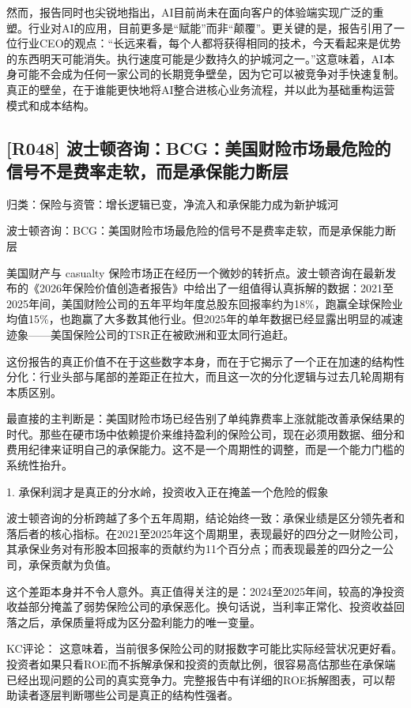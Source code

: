 \documentclass[11pt]{ctexart}
\begin{document}
然而，报告同时也尖锐地指出，AI目前尚未在面向客户的体验端实现广泛的重塑。行业对AI的应用，目前更多是“赋能”而非“颠覆”。更关键的是，报告引用了一位行业CEO的观点：“长远来看，每个人都将获得相同的技术，今天看起来是优势的东西明天可能消失。执行速度可能是少数持久的护城河之一。”这意味着，AI本身可能不会成为任何一家公司的长期竞争壁垒，因为它可以被竞争对手快速复制。真正的壁垒，在于谁能更快地将AI整合进核心业务流程，并以此为基础重构运营模式和成本结构。

\subsection{[R048] 波士顿咨询：BCG：美国财险市场最危险的信号不是费率走软，而是承保能力断层}
{\small\color{refgray}归类：保险与资管：增长逻辑已变，净流入和承保能力成为新护城河}

波士顿咨询：BCG：美国财险市场最危险的信号不是费率走软，而是承保能力断层

美国财产与 casualty 保险市场正在经历一个微妙的转折点。波士顿咨询在最新发布的《2026年保险价值创造者报告》中给出了一组值得认真拆解的数据：2021至2025年间，美国财险公司的五年平均年度总股东回报率约为18\%，跑赢全球保险业均值15\%，也跑赢了大多数其他行业。但2025年的单年数据已经显露出明显的减速迹象——美国保险公司的TSR正在被欧洲和亚太同行追赶。

这份报告的真正价值不在于这些数字本身，而在于它揭示了一个正在加速的结构性分化：行业头部与尾部的差距正在拉大，而且这一次的分化逻辑与过去几轮周期有本质区别。

最直接的主判断是：美国财险市场已经告别了单纯靠费率上涨就能改善承保结果的时代。那些在硬市场中依赖提价来维持盈利的保险公司，现在必须用数据、细分和费用纪律来证明自己的承保能力。这不是一个周期性的调整，而是一个能力门槛的系统性抬升。

1. 承保利润才是真正的分水岭，投资收入正在掩盖一个危险的假象

波士顿咨询的分析跨越了多个五年周期，结论始终一致：承保业绩是区分领先者和落后者的核心指标。在2021至2025年这个周期里，表现最好的四分之一财险公司，其承保业务对有形股本回报率的贡献约为11个百分点；而表现最差的四分之一公司，承保贡献为负值。

这个差距本身并不令人意外。真正值得关注的是：2024至2025年间，较高的净投资收益部分掩盖了弱势保险公司的承保恶化。换句话说，当利率正常化、投资收益回落之后，承保质量将成为区分盈利能力的唯一变量。

KC评论： 这意味着，当前很多保险公司的财报数字可能比实际经营状况更好看。投资者如果只看ROE而不拆解承保和投资的贡献比例，很容易高估那些在承保端已经出现问题的公司的真实竞争力。完整报告中有详细的ROE拆解图表，可以帮助读者逐层判断哪些公司是真正的结构性强者。
\end{document}
